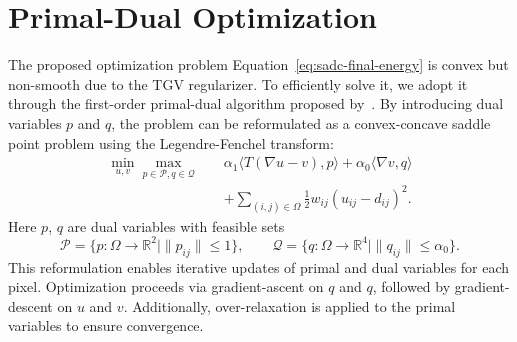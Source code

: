 \section{Primal-Dual Optimization}
The proposed optimization problem Equation~\ref{eq:sadc-final-energy} is convex but non-smooth due to the TGV regularizer.
To efficiently solve it, we adopt it through the first-order primal-dual algorithm proposed by~\cite{chambolle2011first}.
By introducing dual variables $p$ and $q$, the problem can be reformulated as a convex-concave saddle point problem using the Legendre-Fenchel transform:
\begin{equation}
	\begin{aligned}
		\min_{u,v}
		\max_{p\in\mathcal{P},q\in\mathcal{Q}}
		\quad
		&
		\alpha_1
		\langle T(\nabla u-v),p\rangle
		+
		\alpha_0
		\langle \nabla v,q\rangle
		\\
		&
		+
		\sum_{(i,j)\in\Omega}
		\frac{1}{2}w_{ij}(u_{ij}-d_{ij})^{2}.
	\end{aligned}
	\label{eq:sadc-saddle}
\end{equation}
Here $p$, $q$ are dual variables with feasible sets
\begin{equation}
	\mathcal{P}
	=
	\{p:\Omega\rightarrow\mathbb{R}^{2}
	\mid
	\|p_{ij}\|\leq 1\},
	\qquad
	\mathcal{Q}
	=
	\{q:\Omega\rightarrow\mathbb{R}^{4}
	\mid
	\|q_{ij}\|\leq \alpha_0\}.
\end{equation}
This reformulation enables iterative updates of primal and dual variables for each pixel.
Optimization proceeds via gradient-ascent on $q$ and $q$, followed by gradient-descent on $u$ and $v$.
Additionally, over-relaxation is applied to the primal variables to ensure convergence.

